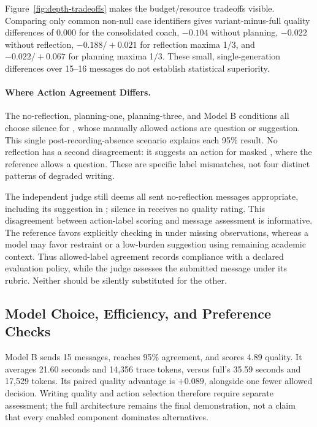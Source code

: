 \documentclass{article}
\newcommand{\code}[1]{\texttt{\detokenize{#1}}}
\begin{document}
Figure~\ref{fig:depth-tradeoffs} makes the budget/resource tradeoffs visible. Comparing only common non-null case identifiers gives variant-minus-full quality differences of 0.000 for the consolidated coach, $-0.104$ without planning, $-0.022$ without reflection, $-0.188/+0.021$ for reflection maxima 1/3, and $-0.022/+0.067$ for planning maxima 1/3. These small, single-generation differences over 15--16 messages do not establish statistical superiority.

\paragraph{Where Action Agreement Differs.} The no-reflection, planning-one, planning-three, and Model B conditions all choose silence for \code{case_010}, whose manually allowed actions are question or suggestion. This single post-recording-absence scenario explains each 95\% result. No reflection has a second disagreement: it suggests an action for masked \code{case_012}, where the reference allows a question. These are specific label mismatches, not four distinct patterns of degraded writing.

The independent judge still deems all sent no-reflection messages appropriate, including its suggestion in \code{case_012}; silence in \code{case_010} receives no quality rating. This disagreement between action-label scoring and message assessment is informative. The reference favors explicitly checking in under missing observations, whereas a model may favor restraint or a low-burden suggestion using remaining academic context. Thus allowed-label agreement records compliance with a declared evaluation policy, while the judge assesses the submitted message under its rubric. Neither should be silently substituted for the other.

\subsection{Model Choice, Efficiency, and Preference Checks}
Model B sends 15 messages, reaches 95\% agreement, and scores 4.89 quality. It averages 21.60 seconds and 14,356 trace tokens, versus full's 35.59 seconds and 17,529 tokens. Its paired quality advantage is $+0.089$, alongside one fewer allowed decision. Writing quality and action selection therefore require separate assessment; the full architecture remains the final demonstration, not a claim that every enabled component dominates alternatives.

\begin{table}[t]
\caption{Efficiency across all cases in each condition. Latency, LLM calls, and tokens are mean $\pm$ sample SD. Actual Planner calls are per case; Critic cycles are per non-null message. Elapsed latency includes provider waits and any dependent re-execution, while judging is excluded. Remote service variability limits causal speed comparisons.}
\label{tab:efficiency}\centering\small\setlength{\tabcolsep}{5pt}

\end{table}
\end{document}
